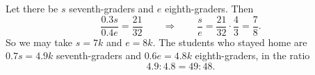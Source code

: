 Let there be $s$ seventh-graders and $e$ eighth-graders. Then
\[
\dfrac{0.3s}{0.4e}=\dfrac{21}{32}\qquad\Longrightarrow\qquad \dfrac {s}{e}=\dfrac{21}{32}\cdot\dfrac{4}{3}=\dfrac{7}{8} .
\]
So we may take $s=7k$ and $e=8k$. The students who stayed home are $0.7s=4.9k$ seventh-graders and $0.6e=4.8k$ eighth-graders, in the ratio
\[
4.9:4.8=\boxed{49:48}.
\]
